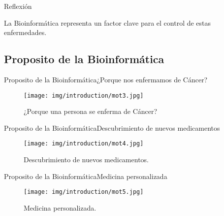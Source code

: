 \documentclass[10pt]{beamer}
\newcommand{\1}{
        	\setbeamertemplate{background}{
        		\texttt{[image: img/1]}
        		\tikz[overlay] \fill[fill opacity=0.75,fill=white] (0,0) rectangle (-\paperwidth,\paperheight);
        	}
}
\begin{document}
\begin{frame}{Reflexión}{}
	\begin{block}{}
		La Bioinformática representa un factor clave para el control de estas enfermedades.
	\end{block}
\end{frame}

\subsection{Proposito de la Bioinformática}

\begin{frame}{Proposito de la Bioinformática}{¿Porque nos enfermamos de Cáncer?}
	\begin{figure}[]
		\centering
		\texttt{[image: img/introduction/mot3.jpg]}
		\caption{¿Porque una persona se enferma de Cáncer?}
	\end{figure}
\end{frame}

\begin{frame}{Proposito de la Bioinformática}{Descubrimiento de nuevos medicamentos}
	\begin{figure}[]
		\centering
		\texttt{[image: img/introduction/mot4.jpg]}
		\caption{Descubrimiento de nuevos medicamentos.}
	\end{figure}
\end{frame}

\begin{frame}{Proposito de la Bioinformática}{Medicina personalizada}
	\begin{figure}[]
		\centering
		\texttt{[image: img/introduction/mot5.jpg]}
		\caption{Medicina personalizada.}
	\end{figure}
\end{frame}
\end{document}
